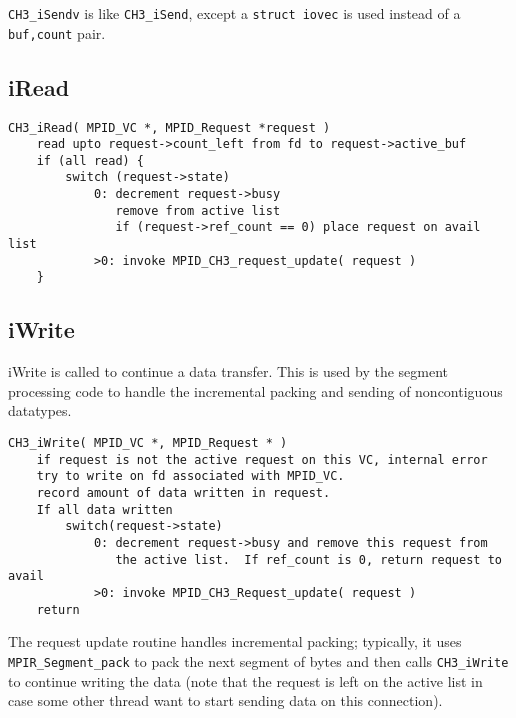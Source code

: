 \documentclass{article}
\def\code{\begingroup\makeustext\eatcode}
\def\eatcode#1{\texttt{#1}\endgroup}
\begin{document}
\code{CH3_iSendv} is like \code{CH3_iSend}, except a \code{struct iovec} is
used instead of a \code{buf,count} pair.

\subsection{iRead}

\begin{verbatim}
CH3_iRead( MPID_VC *, MPID_Request *request )
    read upto request->count_left from fd to request->active_buf
    if (all read) {
        switch (request->state) 
            0: decrement request->busy
               remove from active list
               if (request->ref_count == 0) place request on avail list
            >0: invoke MPID_CH3_request_update( request )
    }
\end{verbatim}

\subsection{iWrite}
iWrite is called to continue a data transfer.  This is used by the
segment processing code to handle the incremental packing and sending
of noncontiguous datatypes.

\begin{verbatim}
CH3_iWrite( MPID_VC *, MPID_Request * )
    if request is not the active request on this VC, internal error
    try to write on fd associated with MPID_VC.  
    record amount of data written in request.
    If all data written
        switch(request->state)
            0: decrement request->busy and remove this request from
               the active list.  If ref_count is 0, return request to avail
            >0: invoke MPID_CH3_Request_update( request )
    return
\end{verbatim}
The request update routine handles incremental packing; typically, it
uses \code{MPIR_Segment_pack} to pack the next segment of bytes and
then calls \code{CH3_iWrite} to continue writing the data (note that
the request is left on the active list in case some other thread want
to start sending data on this connection).
\end{document}
